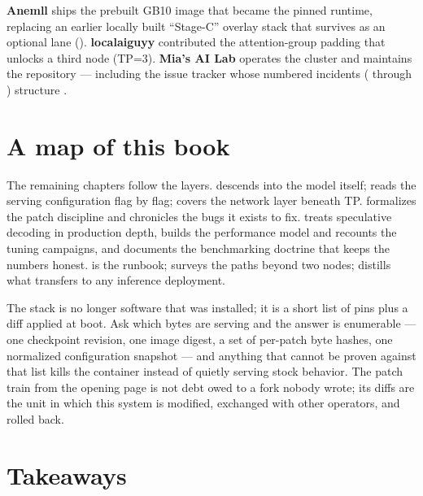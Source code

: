 \textbf{Anemll} ships the prebuilt GB10 image that became the pinned
runtime, replacing an earlier locally built ``Stage-C'' overlay stack that
survives as an optional lane ().
\textbf{localaiguyy} contributed the attention-group padding that unlocks a
third node (TP=3). \textbf{Mia's AI Lab} operates the cluster and maintains
the repository --- including the issue tracker whose numbered incidents
( through ) structure .

\section{A map of this book}
\label{sec:architecture:map}

The remaining chapters follow the layers.  descends into the
model itself;  reads the serving configuration flag by
flag;  covers the network layer beneath TP.
 formalizes the patch discipline and 
chronicles the bugs it exists to fix.  treats
speculative decoding in production depth,  builds the
performance model and recounts the tuning campaigns, and
 documents the benchmarking doctrine that keeps the
numbers honest.  is the runbook; 
surveys the paths beyond two nodes;  distills what
transfers to any inference deployment.

\FloatBarrier
The stack is no longer software that was installed; it is a short list of
pins plus a diff applied at boot. Ask which bytes are serving and the answer
is enumerable --- one checkpoint revision, one image digest, a set of
per-patch byte hashes, one normalized configuration snapshot --- and
anything that cannot be proven against that list kills the container instead
of quietly serving stock behavior. The patch train from the opening page is
not debt owed to a fork nobody wrote; its diffs are the unit in which this
system is modified, exchanged with other operators, and rolled back.

\section*{Takeaways}

